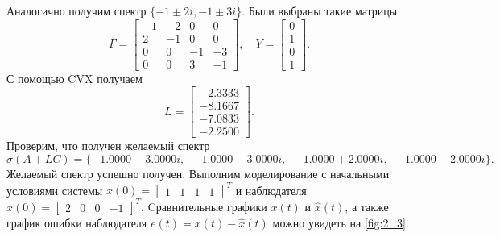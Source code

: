 Аналогично получим спектр $\{-1 \pm 2i, -1 \pm 3i\}$.
Были выбраны такие матрицы
\begin{equation*}
    \Gamma=\begin{bmatrix}
        -1&  -2&  0&  0\\
        2& -1&  0&  0\\
        0&  0& -1&  -3\\
        0&  0&  3& -1
    \end{bmatrix},\quad
    Y=\begin{bmatrix}
        0\\ 1\\ 0\\ 1
    \end{bmatrix}.
\end{equation*} 
С помощью CVX получаем
\begin{equation*}
    L=\begin{bmatrix}
        -2.3333\\
        -8.1667\\
        -7.0833\\
        -2.2500
    \end{bmatrix}.
\end{equation*}
Проверим, что получен желаемый спектр
\begin{equation*}
    \sigma(A+LC)=\{
        -1.0000 + 3.0000i,\ 
        -1.0000 - 3.0000i,\ 
        -1.0000 + 2.0000i,\ 
        -1.0000 - 2.0000i
        \}.
\end{equation*}
Желаемый спектр успешно получен.
Выполним моделирование с начальными условиями системы 
$x(0) = \begin{bmatrix}
    1 & 1 & 1 & 1
\end{bmatrix}^T$ и наблюдателя $\hat x(0) = \begin{bmatrix}
    2 & 0 & 0 & -1
\end{bmatrix}^T$. Cравнительные графики $x(t)$ и $\hat x(t)$, 
а также график ошибки наблюдателя $e(t) = x(t) -\hat x(t)$
можно увидеть на \autoref{fig:2_3}.


